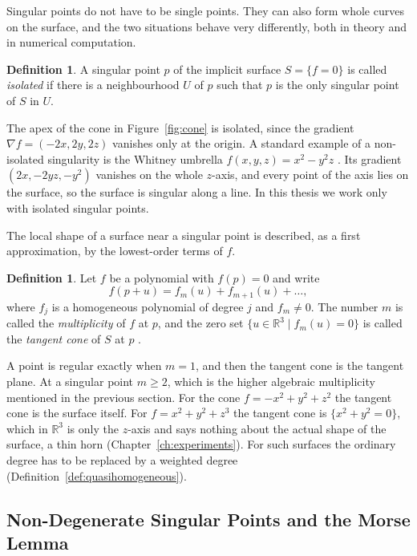 \documentclass[12pt, a4paper, oneside]{book}
\theoremstyle{plain}
\theoremstyle{definition}
\newtheorem{definition}[theorem]{Definition}
\theoremstyle{remark}
\theoremstyle{definition}
\begin{document}
Singular points do not have to be single points. They can also form whole curves on the surface, and the two situations behave very differently, both in theory and in numerical computation.

\begin{definition}
\label{def:isolated}
A singular point $p$ of the implicit surface $S=\{f=0\}$ is called \emph{isolated} if there is a neighbourhood $U$ of $p$ such that $p$ is the only singular point of $S$ in $U$.
\end{definition}

The apex of the cone in Figure~\ref{fig:cone} is isolated, since the gradient $\nabla f=(-2x,2y,2z)$ vanishes only at the origin. A standard example of a non-isolated singularity is the Whitney umbrella $f(x,y,z)=x^2-y^2z$ \cite{umehara2022differential}. Its gradient $(2x,-2yz,-y^2)$ vanishes on the whole $z$-axis, and every point of the axis lies on the surface, so the surface is singular along a line. In this thesis we work only with isolated singular points.

The local shape of a surface near a singular point is described, as a first approximation, by the lowest-order terms of $f$.

\begin{definition}
\label{def:tangent-cone}
Let $f$ be a polynomial with $f(p)=0$ and write
\[
f(p+u)=f_m(u)+f_{m+1}(u)+\dots,
\]
where $f_j$ is a homogeneous polynomial of degree $j$ and $f_m\neq0$. The number $m$ is called the \emph{multiplicity} of $f$ at $p$, and the zero set $\{u\in\mathbb{R}^3 \mid f_m(u)=0\}$ is called the \emph{tangent cone} of $S$ at $p$ \cite{dimca1992singularities}.
\end{definition}

A point is regular exactly when $m=1$, and then the tangent cone is the tangent plane. At a singular point $m\ge2$, which is the higher algebraic multiplicity mentioned in the previous section. For the cone $f=-x^2+y^2+z^2$ the tangent cone is the surface itself. For $f=x^2+y^2+z^3$ the tangent cone is $\{x^2+y^2=0\}$, which in $\mathbb{R}^3$ is only the $z$-axis and says nothing about the actual shape of the surface, a thin horn (Chapter~\ref{ch:experiments}). For such surfaces the ordinary degree has to be replaced by a weighted degree (Definition~\ref{def:quasihomogeneous}).

\subsection{Non-Degenerate Singular Points and the Morse Lemma}
\end{document}

